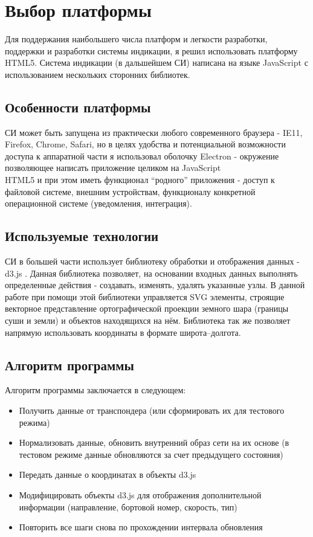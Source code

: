 \documentclass[a4paper,12pt]{report} %
\begin{document}
\section{Выбор платформы}

Для поддержания наибольшего числа платформ и легкости разработки, поддержки и
разработки системы индикации, я решил использовать платформу HTML5. Система
индикации (в дальшейшем СИ) написана на языке JavaScript с использованием
нескольких сторонних библиотек.

\subsection{Особенности платформы}

СИ может быть запущена из практически любого современного браузера - IE11,
Firefox, Chrome, Safari, но в целях удобства и потенциальной возможности доступа
к аппаратной части я использовал оболочку Electron\cite{electron} - окружение позволяющее
написать приложение целиком на JavaScript\\HTML5 и при этом иметь функционал
``родного'' приложения - доступ к файловой системе, внешним устройствам,
функционалу конкретной операционной системе (уведомления, интеграция).

\subsection{Используемые технологии}

СИ в большей части использует библиотеку обработки и отображения данных - d3.js \cite{d3js}.
Данная библиотека позволяет, на основании входных данных выполнять определенные
действия - создавать, изменять, удалять указанные узлы. В данной работе при
помощи этой библиотеки управляется SVG элементы, строящие векторное
представление ортографической проекции земного шара (границы суши и земли) и
объектов находящихся на нём. Библиотека так же позволяет напрямую использовать
координаты в формате широта--долгота.

\subsection{Алгоритм программы}

Алгоритм программы заключается в следующем:
\begin{itemize}
\item Получить данные от транспондера (или сформировать их для тестового режима)
\item Нормализовать данные, обновить внутренний образ сети на их основе (в
  тестовом режиме данные обновляются за счет предыдущего состояния)
\item Передать данные о координатах в объекты d3.js
\item Модифицировать объекты d3.js для отображения дополнительной информации
  (направление, бортовой номер, скорость, тип)
\item Повторить все шаги снова по прохождении интервала обновления
\end{itemize}
\newpage
\end{document}
